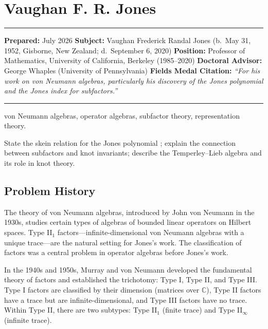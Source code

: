 \chapter{Vaughan F. R. Jones}\label{ch1990vaughanjones:vaughan-f.-r.-jones-fields-medal-1990-a-comprehensive-report}

\begin{center}\rule{0.5\linewidth}{0.5pt}\end{center}

\textbf{Prepared:} July 2026 \textbf{Subject:} Vaughan Frederick Randal Jones (b.~May 31, 1952, Gisborne, New Zealand; d.~September 6, 2020) \textbf{Position:} Professor of Mathematics, University of California, Berkeley (1985--2020) \textbf{Doctoral Advisor:} George Whaples (University of Pennsylvania) \textbf{Fields Medal Citation:} \emph{``For his work on von Neumann algebras, particularly his discovery of the Jones polynomial and the Jones index for subfactors.''}

\begin{center}\rule{0.5\linewidth}{0.5pt}\end{center}

\begin{prereqs} von Neumann algebras, operator algebras, subfactor theory, representation theory. \end{prereqs}

\begin{objectives} State the skein relation for the Jones polynomial \cite{jones1985}; explain the connection between subfactors and knot invariants; describe the Temperley--Lieb algebra and its role in knot theory. \end{objectives}

\section{Problem History}

The theory of von Neumann algebras, introduced by John von Neumann in the 1930s, studies certain types of algebras of bounded linear operators on Hilbert spaces. Type II$_1$ factors---infinite-dimensional von Neumann algebras with a unique trace---are the natural setting for Jones's work. The classification of factors was a central problem in operator algebras before Jones's work.

In the 1940s and 1950s, Murray and von Neumann developed the fundamental theory of factors and established the trichotomy: Type I, Type II, and Type III. Type I factors are classified by their dimension (matrices over $\mathbb{C}$), Type II factors have a trace but are infinite-dimensional, and Type III factors have no trace. Within Type II, there are two subtypes: Type II$_1$ (finite trace) and Type II$_\infty$ (infinite trace).

